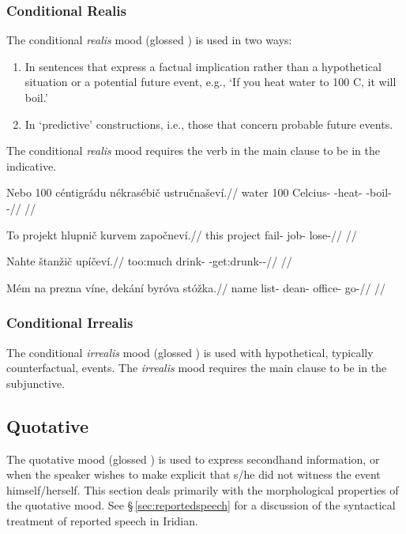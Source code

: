 \subsubsection{Conditional Realis}

\par The conditional \textit{realis} mood (glossed ) is used in two ways:
\begin{enumerate}
	\item In sentences that express a factual implication rather than a hypothetical situation or a potential future event, e.g., `If you heat water to 100 C, it will boil.'
	\item In `predictive' constructions, i.e., those that concern probable future events.
\end{enumerate}

The conditional \emph{realis} mood requires the verb in the main clause to be in the indicative.


\pex
\begingl
\gla Nebo 100 céntigrádu nékrasébič ustručnaševí.//
\glb water 100 Celcius-\Ins{} \Caus{}-heat- \Refl{}-boil-\Av{}-\Cont{}//
\glft {}//
\endgl
\xe

\pex
\begingl
\gla To projekt hlupnič kurvem započneví.//
\glb this project fail- job-\First{}\Sg{} lose-//
\glft {}//
\endgl
\xe

\pex
\begingl
\gla Nahte štanžič upíčeví.//
\glb too:much drink- \Refl{}-get:drunk-\Av{}-\Cont{}//
\glft {}//
\endgl
\xe

\pex
\begingl
\gla Mém na prezna víne, dekání byróva stóžka.//
\glb name \Loc{} list-\Acc{}  dean-\Gen{} office-\Acc{} go-//
\glft {}//
\endgl
\xe

\subsubsection{Conditional Irrealis}
The conditional \textit{irrealis} mood (glossed ) is used with hypothetical, typically counterfactual, events. The \emph{irrealis} mood requires the main clause to be in the subjunctive.

\subsection{Quotative}\label{sec:quotative}
\par The quotative mood (glossed ) is used to express secondhand information, or when the speaker wishes to make explicit that s/he did not witness the event himself/herself. This section deals primarily with the morphological properties of the quotative mood. See \S\,\ref{sec:reportedspeech} for a discussion of the syntactical treatment of reported speech in Iridian.

